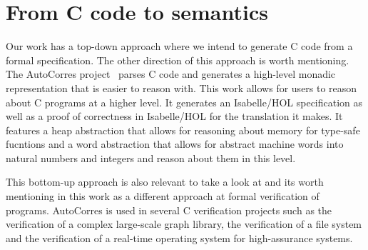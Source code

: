 \section{From C code to semantics}

Our work has a top-down approach where we intend to generate C code from a formal specification.
The other direction of this approach is worth mentioning.
The AutoCorres project~\parencite{autocorres} parses C code and generates a high-level monadic representation that is easier to reason with.
This work allows for users to reason about C programs at a higher level.
It generates an Isabelle/HOL specification as well as a proof of correctness in Isabelle/HOL for the translation it makes.
It features a heap abstraction that allows for reasoning about memory for type-safe fucntions and a word abstraction that allows for abstract machine words into natural numbers and integers and reason about them in this level.

This bottom-up approach is also relevant to take a look at and its worth mentioning in this work as a different approach at formal verification of programs.
AutoCorres is used in several C verification projects such as the verification of a complex large-scale graph library, the verification of a file system and the verification of a real-time operating system for high-assurance systems.
